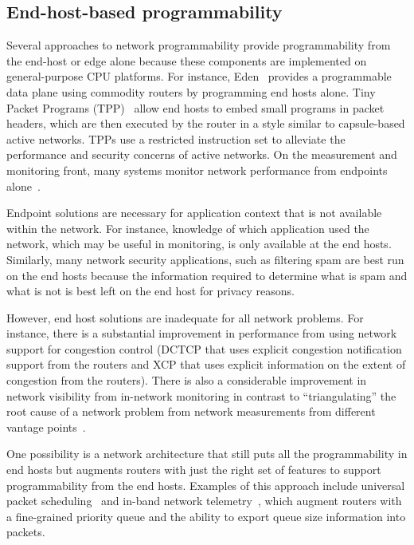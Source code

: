 \subsection{End-host-based programmability}
Several approaches to network programmability provide programmability from the
end-host or edge alone because these components are implemented on
general-purpose CPU platforms. For instance, Eden~\cite{eden} provides a
programmable data plane using commodity routers by programming end hosts alone.
Tiny Packet Programs (TPP)~\cite{tpp} allow end hosts to embed small programs
in packet headers, which are then executed by the router in a style similar to
capsule-based active networks. TPPs use a restricted instruction set to
alleviate the performance and security concerns of active networks. On the
measurement and monitoring front, many systems monitor network performance from
endpoints alone~\cite{netpoirot, minlan-snap, dapper-sosr, trumpet,
azure-smartnic}.

Endpoint solutions are necessary for application context that is not available
within the network. For instance, knowledge of which application used the
network, which may be useful in monitoring, is only available at the end hosts.
Similarly, many network security applications, such as filtering spam are best
run on the end hosts because the information required to determine what is spam
and what is not is best left on the end host for privacy reasons.

However, end host solutions are inadequate for all network problems. For
instance, there is a substantial improvement in performance from using network
support for congestion control (\eg DCTCP that uses explicit congestion
notification support from the routers and XCP that uses explicit information on
the extent of congestion from the routers). There is also a considerable
improvement in network visibility from in-network monitoring in contrast to
``triangulating'' the root cause of a network problem from network measurements
from different vantage points~\cite{pingmesh}.

One possibility is a network architecture that still puts all the
programmability in end hosts but augments routers with just the right set of
features to support programmability from the end hosts. Examples of this
approach include universal packet scheduling~\cite{ups} and in-band network
telemetry~\cite{int}, which augment routers with a fine-grained priority queue
and the ability to export queue size information into packets.

